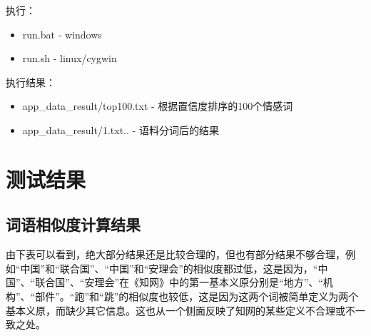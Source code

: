 \documentclass[11pt,a4paper]{article}
\begin{document}
执行：

\begin{itemize}
\item  run.bat  - windows
\item  run.sh   - linux/cygwin
\end{itemize}

执行结果：

\begin{itemize}
\item  app\_data\_result/top100.txt - 根据置信度排序的100个情感词
\item  app\_data\_result/1.txt..    - 语料分词后的结果
\end{itemize}

\section{测试结果}

\subsection{词语相似度计算结果}

由下表可以看到，绝大部分结果还是比较合理的，但也有部分结果不够合理，例如“中国”和“联合国”、“中国”和“安理会”的相似度都过低，这是因为，“中国”、“联合国”、“安理会”在《知网》中的第一基本义原分别是“地方”、“机构”、“部件”。“跑”和“跳”的相似度也较低，这是因为这两个词被简单定义为两个基本义原，而缺少其它信息。这也从一个侧面反映了知网的某些定义不合理或不一致之处。
\end{document}
